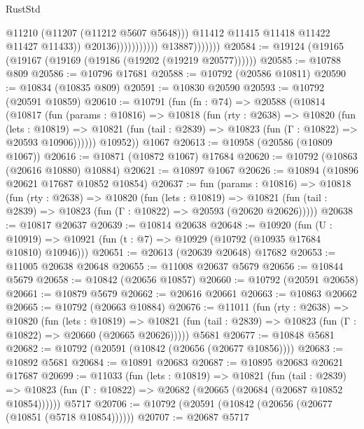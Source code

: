 \begin{lexlean}{RustStd}
\begin{coremodule}
                                              @11210
                                              (@11207 (@11212 @5607 @5648)))
                                            @11412
                                            @11415
                                            @11418
                                            @11422
                                            @11427
                                            @11433))
                                        @20136)))))))))))
                  @13887)))))))
@20584 := @19124 (@19165 (@19167 (@19169 (@19186 (@19202 (@19219 @20577))))))
@20585 := @10788 @809
@20586 := @10796 @17681
@20588 := @10792 (@20586 @10811)
@20590 := @10834 (@10835 @809)
@20591 := @10830 @20590
@20593 := @10792 (@20591 @10859)
@20610 := @10791
    (fun (fn : @74) =>
    @20588
      (@10814
        (@10817
          (fun (params : @10816) =>
          @10818
            (fun (rty : @2638) =>
            @10820
              (fun (lets : @10819) =>
              @10821 (fun (tail : @2839) => @10823 (fun (Γ : @10822) => @20593 @10906))))))
        @10952))
    @1067
@20613 := @10958 (@20586 (@10809 @1067))
@20616 := @10871 (@10872 @1067) @17684
@20620 := @10792 (@10863 (@20616 @10880) @10884)
@20621 := @10897 @1067
@20626 := @10894 (@10896 @20621 @17687 @10852 @10854)
@20637 := fun (params : @10816) =>
  @10818
    (fun (rty : @2638) =>
    @10820
      (fun (lets : @10819) =>
      @10821 (fun (tail : @2839) => @10823 (fun (Γ : @10822) => @20593 (@20620 @20626)))))
@20638 := @10817 @20637
@20639 := @10814 @20638
@20648 := @10920
    (fun (U : @10919) => @10921 (fun (t : @7) => @10929 (@10792 (@10935 @17684 @10810) @10946)))
@20651 := @20613 (@20639 @20648) @17682
@20653 := @11005 @20638 @20648
@20655 := @11008 @20637 @5679
@20656 := @10844 @5679
@20658 := @10842 (@20656 @10857)
@20660 := @10792 (@20591 @20658)
@20661 := @10879 @5679
@20662 := @20616 @20661
@20663 := @10863 @20662
@20665 := @10792 (@20663 @10884)
@20676 := @11011
    (fun (rty : @2638) =>
    @10820
      (fun (lets : @10819) =>
      @10821 (fun (tail : @2839) => @10823 (fun (Γ : @10822) => @20660 (@20665 @20626)))))
    @5681
@20677 := @10848 @5681
@20682 := @10792 (@20591 (@10842 (@20656 (@20677 @10856))))
@20683 := @10892 @5681
@20684 := @10891 @20683
@20687 := @10895 @20683 @20621 @17687
@20699 := @11033
    (fun (lets : @10819) =>
    @10821
      (fun (tail : @2839) =>
      @10823 (fun (Γ : @10822) => @20682 (@20665 (@20684 (@20687 @10852 @10854))))))
    @5717
@20706 := @10792 (@20591 (@10842 (@20656 (@20677 (@10851 (@5718 @10854))))))
@20707 := @20687 @5717

\end{coremodule}
\end{lexlean}
